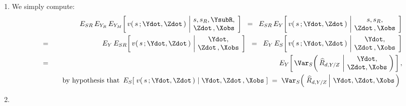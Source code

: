 \begin{enumerate}
\item
    We simply compute:
    \begin{eqnarray*}
    &&
        E_{SR}\,
        E_{Y_{R}}\,
        E_{Y_{M}}\!\left[\,
            v(\,s\,;\Ydot,\Zdot\,)
            \,\left\vert\!
            \begin{array}{c} s,s_{R},\YsubR, \\ \Zdot\,,\Xobs \end{array}
            \right.
            \!\right]
    \;\; = \;\;
        E_{SR}\,
        E_{Y}\!\left[\,
            v(\,s\,;\Ydot,\Zdot\,)
            \,\left\vert\!
            \begin{array}{c} s,s_{R}, \\ \Zdot\,,\Xobs \end{array}
            \right.
            \!\right]
    \\
    & = &
        E_{Y}\,
        E_{SR}\!\left[\,
            v(\,s\,;\Ydot,\Zdot\,)
            \,\left\vert\!
            \begin{array}{c} \Ydot, \\ \Zdot\,,\Xobs \end{array}
            \right.
            \!\right]
    \;\; = \;\;
        E_{Y}\,
        E_{S}\!\left[\,
            v(\,s\,;\Ydot,\Zdot\,)
            \,\left\vert\!
            \begin{array}{c} \Ydot, \\ \Zdot\,,\Xobs \end{array}
            \right.
            \!\right]
    \\
    & = &
        E_{Y}\!\left[\,
            \Var_{S}\!\left(\,
                \widehat{R}_{d,Y/Z}
                \,\left\vert\!
                \begin{array}{c} \Ydot, \\ \Zdot, \Xobs \end{array}
                \right.
                \!\!\right)
            \,\right],
    \\
    &&
    \quad
    \textnormal{by hypothesis that
    \,$
    E_{S}\!\left[\;
        v(\,s\,;\Ydot,\Zdot\,)
        \,\left\vert\;
        \Ydot,\Zdot\,,\Xobs
        \right.
        \,\right]
    \; = \;
        \Var_{S}\!\left(\,
            \left.
            \widehat{R}_{d,Y/Z}
            \,\right\vert\,
            \Ydot,
            \Zdot,
            \Xobs
            \,\right)
    $
    }
    \end{eqnarray*}
\item

\end{enumerate}
